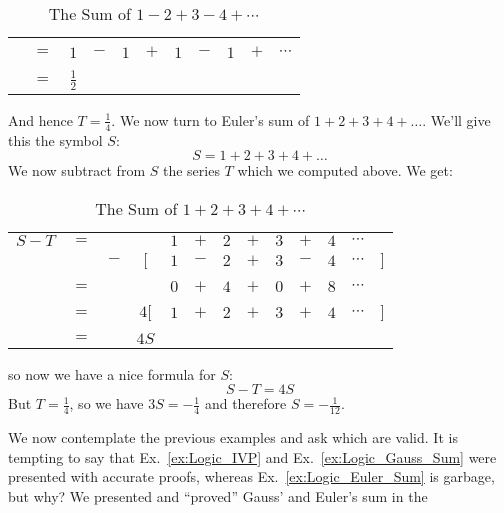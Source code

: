\begin{example}
\begin{table}[H]
\begin{tabular}{ccccccccccc}
                \hline\\
                    &$=$&$1$&$-$&$1$&$+$&$1$&$-$&$1$&$+$&$\cdots$\\
                \hline\\
                &$=$&$\frac{1}{2}$
            \end{tabular}
            \caption{The Sum of $1-2+3-4+\cdots$}
        \end{table}
        And hence $T=\frac{1}{4}$. We now turn to Euler's sum of
        $1+2+3+4+\dots$. We'll give this the symbol $S$:
        \begin{equation}
            S=1+2+3+4+\dots
        \end{equation}
        We now subtract from $S$ the series $T$ which we computed above. We get:
        \begin{table}[H]
            \centering
            \captionsetup{type=table}
            \begin{tabular}{ccccccccccccc}
                $S-T$&$=$&&       &$1$&$+$&$2$&$+$&$3$&$+$&$4$&$\cdots$\\
                     &&$-$&$\Big[$&$1$&$-$&$2$&$+$&$3$&$-$&$4$&$\cdots$&$\Big]$
                \\[1ex]
                \hline\\
                     &$=$&&&$0$&$+$&$4$&$+$&$0$&$+$&$8$&$\cdots$\\[1ex]
                \hline\\
                &$=$&&$4\Big[$&$1$&$+$&$2$&$+$&$3$&$+$&$4$&$\cdots$&$\Big]$
                    \\[1ex]
                \hline\\
                &$=$&&$4S$
            \end{tabular}
            \caption{The Sum of $1+2+3+4+\cdots$}
        \end{table}
        so now we have a nice formula for $S$:
        \begin{equation}
            S-T=4S
        \end{equation}
        But $T=\frac{1}{4}$, so we have $3S=\minus\frac{1}{4}$ and therefore
        $S=\minus\frac{1}{12}$.
    \end{example}
    We now contemplate the previous examples and ask which are valid. It is
    tempting to say that Ex.~\ref{ex:Logic_IVP} and Ex.~\ref{ex:Logic_Gauss_Sum}
    were presented with accurate proofs, whereas Ex.~\ref{ex:Logic_Euler_Sum} is
    garbage, but why? We presented and ``proved'' Gauss' and Euler's sum in the
